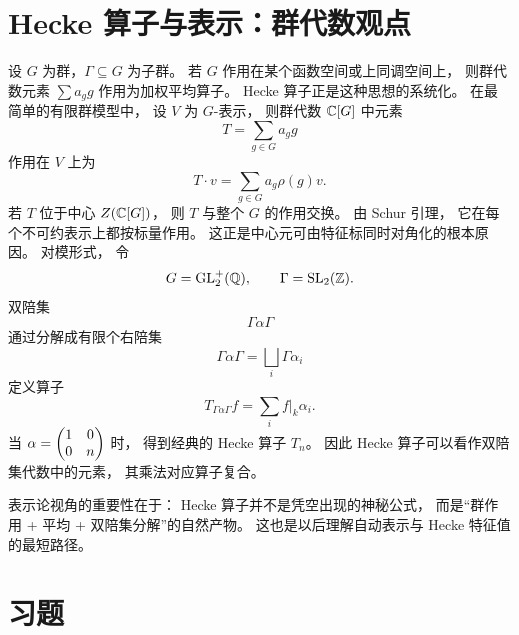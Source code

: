 \section{Hecke 算子与表示：群代数观点}
设 $G$ 为群，$\Gamma\subseteq G$ 为子群。 若 $G$ 作用在某个函数空间或上同调空间上， 则群代数元素 $\sum a_g g$ 作用为加权平均算子。 Hecke 算子正是这种思想的系统化。 在最简单的有限群模型中， 设 $V$ 为 $G$-表示， 则群代数 $\mathbb{C}[G]$ 中元素
\[
T=\sum_{g\in G} a_g g
\]
作用在 $V$ 上为
\[
T\cdot v=\sum_{g\in G} a_g\rho(g)v.
\]
若 $T$ 位于中心 $Z(\mathbb{C}[G])$， 则 $T$ 与整个 $G$ 的作用交换。 由 Schur 引理， 它在每个不可约表示上都按标量作用。 这正是中心元可由特征标同时对角化的根本原因。 对模形式， 令
\[
G=\mathrm{GL}_2^+(\mathbb{Q}),\qquad \Gamma=\mathrm{SL}_2(\mathbb{Z}).
\]
双陪集
\[
\Gamma \alpha \Gamma
\]
通过分解成有限个右陪集
\[
\Gamma\alpha\Gamma=\bigsqcup_i \Gamma \alpha_i
\]
定义算子
\[
T_{\Gamma\alpha\Gamma}f=\sum_i f|_k\alpha_i.
\]
当 $\alpha=\begin{pmatrix} 1&0\\0&n \end{pmatrix}$ 时， 得到经典的 Hecke 算子 $T_n$。 因此 Hecke 算子可以看作双陪集代数中的元素， 其乘法对应算子复合。
\begin{remark}
表示论视角的重要性在于： Hecke 算子并不是凭空出现的神秘公式， 而是“群作用 + 平均 + 双陪集分解”的自然产物。 这也是以后理解自动表示与 Hecke 特征值的最短路径。
\end{remark}
\section*{习题}
